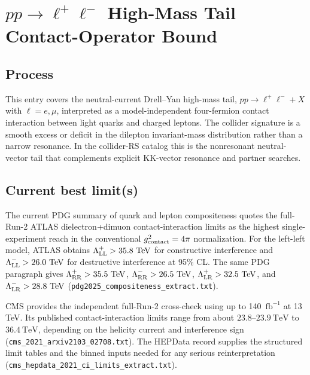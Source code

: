 
\section{\texorpdfstring{\(pp\to \ell^+\ell^-\) High-Mass Tail Contact-Operator Bound}{pp to l+l- High-Mass Tail Contact-Operator Bound}}

\subsection*{Process}
This entry covers the neutral-current Drell--Yan high-mass tail,
\(pp\to \ell^+\ell^-+X\) with \(\ell=e,\mu\), interpreted as a
model-independent four-fermion contact interaction between light quarks and
charged leptons.  The collider signature is a smooth excess or deficit in the
dilepton invariant-mass distribution rather than a narrow resonance.  In the
collider-RS catalog this is the nonresonant neutral-vector tail that
complements explicit KK-vector resonance and partner searches.

\subsection*{Current best limit(s)}
The current PDG summary of quark and lepton compositeness quotes the
full-Run-2 ATLAS dielectron+dimuon contact-interaction limits as the highest
single-experiment reach in the conventional \(g_{\rm contact}^2=4\pi\)
normalization.  For the left-left model, ATLAS obtains
\(\Lambda_{\rm LL}^{+}>35.8~\mathrm{TeV}\) for constructive interference and
\(\Lambda_{\rm LL}^{-}>26.0~\mathrm{TeV}\) for destructive interference at
95\% CL.  The same PDG paragraph gives \(\Lambda_{\rm RR}^{+}>35.5~\mathrm{TeV}\),
\(\Lambda_{\rm RR}^{-}>26.5~\mathrm{TeV}\), \(\Lambda_{\rm LR}^{+}>32.5~\mathrm{TeV}\),
and \(\Lambda_{\rm LR}^{-}>28.8~\mathrm{TeV}\)
(\texttt{pdg2025\_compositeness\_extract.txt}).

CMS provides the independent full-Run-2 cross-check using up to
140~\(\mathrm{fb}^{-1}\) at 13 TeV.  Its published contact-interaction
limits range from about \(23.8\)--\(23.9~\mathrm{TeV}\) to
\(36.4~\mathrm{TeV}\), depending on the helicity current and interference
sign (\texttt{cms\_2021\_arxiv2103\_02708.txt}).  The HEPData record supplies
the structured limit tables and the binned inputs needed for any serious
reinterpretation (\texttt{cms\_hepdata\_2021\_ci\_limits\_extract.txt}).

